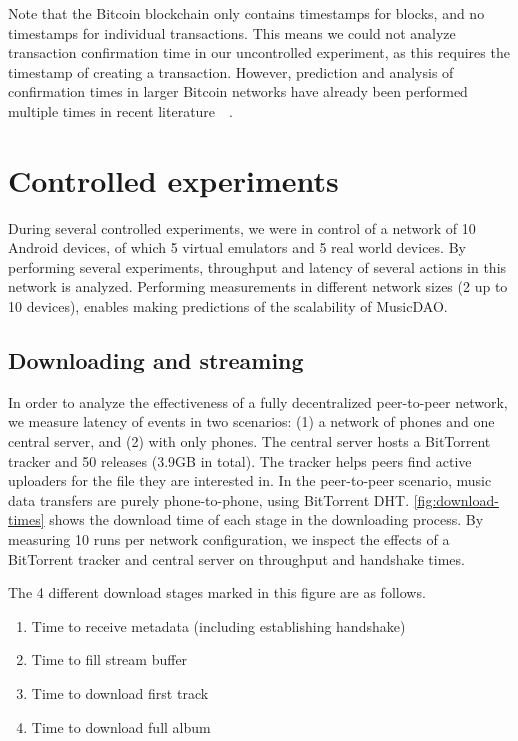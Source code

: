Note that the Bitcoin blockchain only contains timestamps for blocks, and no timestamps for individual transactions. This means we could not analyze transaction confirmation time in our uncontrolled experiment, as this requires the timestamp of creating a transaction. However, prediction and analysis of confirmation times in larger Bitcoin networks have already been performed multiple times in recent literature~\citep{kawase2017transaction}~\citep{koops2018predicting}.

\section{Controlled experiments}
During several controlled experiments, we were in control of a network of 10 Android devices, of which 5 virtual emulators and 5 real world devices. By performing several experiments, throughput and latency of several actions in this network is analyzed. Performing measurements in different network sizes (2 up to 10 devices), enables making predictions of the scalability of MusicDAO.

\subsection{Downloading and streaming}
In order to analyze the effectiveness of a fully decentralized peer-to-peer network, we measure latency of events in two scenarios: (1) a network of phones and one central server, and (2) with only phones. The central server hosts a BitTorrent tracker and 50 releases (3.9GB in total). The tracker helps peers find active uploaders for the file they are interested in. In the peer-to-peer scenario, music data transfers are purely phone-to-phone, using BitTorrent DHT. \ref{fig:download-times} shows the download time of each stage in the downloading process. By measuring 10 runs per network configuration, we inspect the effects of a BitTorrent tracker and central server on throughput and handshake times.

The 4 different download stages marked in this figure are as follows.

\begin{enumerate}
    \item Time to receive metadata (including establishing handshake)
    \item Time to fill stream buffer
    \item Time to download first track
    \item Time to download full album
\end{enumerate}

